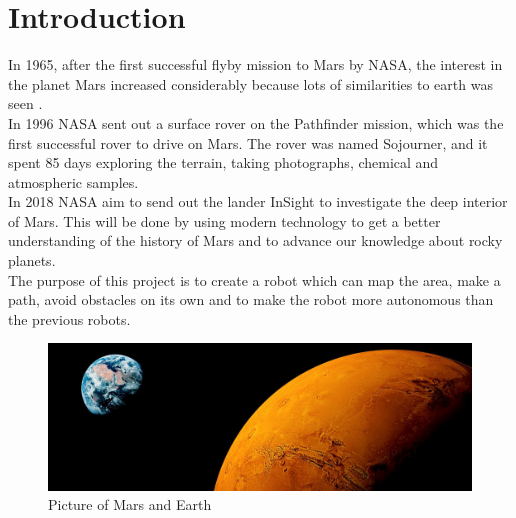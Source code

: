 \chapter{Introduction}\label{ch:introduction}

In 1965, after the first successful flyby mission to Mars by NASA, the interest in the planet Mars increased considerably because lots of similarities to earth was seen \cite{NASAChronology}.\\
In 1996 NASA sent out a surface rover on the Pathfinder mission, which was the first successful rover to drive on Mars. The rover was named Sojourner, and it spent 85 days exploring the terrain, taking photographs, chemical and atmospheric samples\cite{NASASojournerPathfinder}\cite{NASAChronology}.\\
In 2018 NASA aim to send out the lander InSight to investigate the deep interior of Mars. This will be done by using modern technology to get a better understanding of the history of Mars and to advance our knowledge about rocky planets\cite{InSight}.\\

The purpose of this project is to create a robot which can map the area, make a path, avoid obstacles on its own and to make the robot more autonomous than the previous robots. %


\begin{figure}[h]
    \centering
    \includegraphics[width=\linewidth]{figures/639620382-mars.jpg}
    \caption{Picture of Mars and Earth\cite{MarsPics}}
    \label{fig:marsSeasons}
\end{figure}

